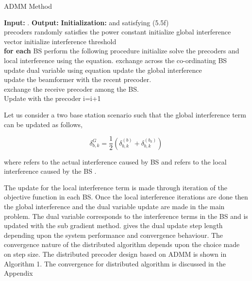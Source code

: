 \begin{algorithm}[h]
	\caption[Distributed Precoder Design]{ADMM Method}
	\label{algo-1}
	\begin{algorithmic}
		\label{algo--1}
		\STATE \textbf{Input:} .
		\STATE \textbf{Output:} 
		\STATE \textbf{Initialization:}  and  satisfying (5.5f)\\
		precoders randomly satisfies the power constant 
		\STATE initialize global interference vector 
		\STATE initialize interference threshold \\
		\STATE \textbf{for each} \ac{BS}  perform the following procedure
		\REPEAT 
		\STATE initialize  
		\REPEAT	
		\STATE solve the precoders  and local interference  using the equation.
		\STATE exchange  across the co-ordinating \ac{BS} 
		\STATE update dual variable \me{\lambda} using equation
		\STATE update the global interference
		\\
		\STATE update the beamformer  with the recent precoder.\\ 
		\STATE exchange the receive precoder  among the \ac{BS}.\\
		Update  with the precoder 
		i=i+1
	\end{algorithmic} 
\end{algorithm}

Let us consider a two base station scenario such that the global interference term can be updated as follows,

\begin{equation}
\delta ^ {G}_{b,k} ={ \frac 1 {2}}{(\delta^{(b)}_{b,k}+\delta^{(b_k)}_{b,k})}
\label{deltaupdate_eqn}
\end{equation}

where  refers to the actual interference caused by BS  and  refers to the local interference caused by the BS .

The update for the local interference term is made through iteration of the objective function in each BS. Once the local interference iterations are done then the global interference and the dual variable update are made in the main problem. The dual variable corresponds to the interference terms in the BS  and is updated with the sub gradient method. \me{\rho} gives the dual update step length depending upon the system performance and convergence behaviour. The convergence nature  of the distributed algorithm depends upon the choice made on step size. The distributed precoder design based on \ac{ADMM} is shown in Algorithm 1. The convergence for distributed algorithm is discussed in the Appendix

